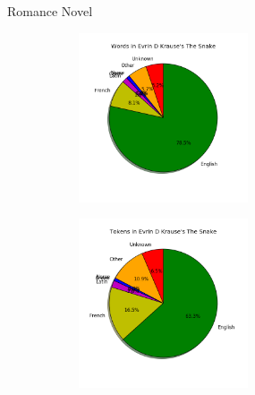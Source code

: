 \documentclass[10pt]{beamer}
\begin{document}
\begin{frame}[fragile]{Romance Novel}

  \begin{figure}
  \centering
  \begin{subfigure}
  \centering
    \includegraphics[width=5cm]{romancewords.png}
  \end{subfigure}
  \begin{subfigure}
  \centering
    \includegraphics[width=5cm]{romancetokens.png}
  \end{subfigure}
  \end{figure}
  
\end{frame}
\end{document}
